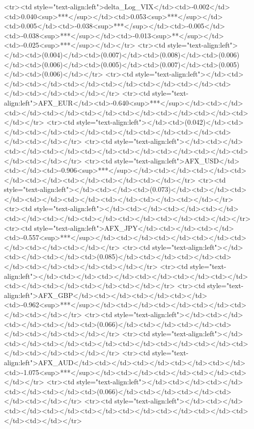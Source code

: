 <tr><td style="text-align:left">delta_Log_VIX</td><td>-0.002</td><td>0.040<sup>***</sup></td><td>0.053<sup>***</sup></td><td>0.005</td><td>-0.038<sup>***</sup></td><td>-0.005</td><td>-0.038<sup>***</sup></td><td>-0.013<sup>**</sup></td><td>-0.025<sup>***</sup></td></tr>
<tr><td style="text-align:left"></td><td>(0.004)</td><td>(0.007)</td><td>(0.008)</td><td>(0.006)</td><td>(0.006)</td><td>(0.005)</td><td>(0.007)</td><td>(0.005)</td><td>(0.006)</td></tr>
<tr><td style="text-align:left"></td><td></td><td></td><td></td><td></td><td></td><td></td><td></td><td></td><td></td></tr>
<tr><td style="text-align:left">AFX_EUR</td><td>-0.640<sup>***</sup></td><td></td><td></td><td></td><td></td><td></td><td></td><td></td><td></td></tr>
<tr><td style="text-align:left"></td><td>(0.042)</td><td></td><td></td><td></td><td></td><td></td><td></td><td></td><td></td></tr>
<tr><td style="text-align:left"></td><td></td><td></td><td></td><td></td><td></td><td></td><td></td><td></td><td></td></tr>
<tr><td style="text-align:left">AFX_USD</td><td></td><td>-0.906<sup>***</sup></td><td></td><td></td><td></td><td></td><td></td><td></td><td></td></tr>
<tr><td style="text-align:left"></td><td></td><td>(0.073)</td><td></td><td></td><td></td><td></td><td></td><td></td><td></td></tr>
<tr><td style="text-align:left"></td><td></td><td></td><td></td><td></td><td></td><td></td><td></td><td></td><td></td></tr>
<tr><td style="text-align:left">AFX_JPY</td><td></td><td></td><td>-0.557<sup>***</sup></td><td></td><td></td><td></td><td></td><td></td><td></td></tr>
<tr><td style="text-align:left"></td><td></td><td></td><td>(0.085)</td><td></td><td></td><td></td><td></td><td></td><td></td></tr>
<tr><td style="text-align:left"></td><td></td><td></td><td></td><td></td><td></td><td></td><td></td><td></td><td></td></tr>
<tr><td style="text-align:left">AFX_GBP</td><td></td><td></td><td></td><td>-0.962<sup>***</sup></td><td></td><td></td><td></td><td></td><td></td></tr>
<tr><td style="text-align:left"></td><td></td><td></td><td></td><td>(0.066)</td><td></td><td></td><td></td><td></td><td></td></tr>
<tr><td style="text-align:left"></td><td></td><td></td><td></td><td></td><td></td><td></td><td></td><td></td><td></td></tr>
<tr><td style="text-align:left">AFX_AUD</td><td></td><td></td><td></td><td></td><td>-1.075<sup>***</sup></td><td></td><td></td><td></td><td></td></tr>
<tr><td style="text-align:left"></td><td></td><td></td><td></td><td></td><td>(0.066)</td><td></td><td></td><td></td><td></td></tr>
<tr><td style="text-align:left"></td><td></td><td></td><td></td><td></td><td></td><td></td><td></td><td></td><td></td></tr>

